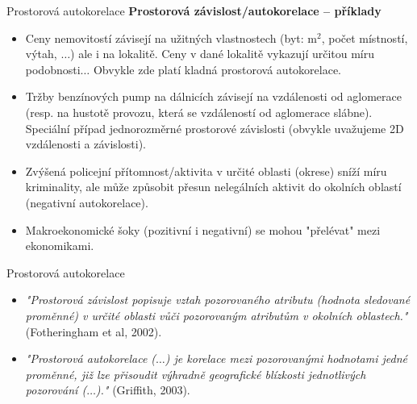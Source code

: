 \documentclass{beamer}
\begin{document}
\begin{frame}{Prostorová autokorelace}
\textbf{Prostorová závislost/autokorelace – příklady}
\begin{itemize}
	\item Ceny nemovitostí závisejí na užitných vlastnostech (byt: m$^2$, počet místností, výtah, $\dots$) ale i na lokalitě. Ceny v dané lokalitě vykazují určitou míru podobnosti$\dots$ Obvykle zde platí kladná prostorová autokorelace. 
	\item Tržby benzínových pump na dálnicích závisejí na vzdálenosti od aglomerace (resp. na hustotě provozu, která se vzdáleností od aglomerace slábne). Speciální případ jednorozměrné prostorové závislosti (obvykle uvažujeme 2D vzdálenosti a závislosti).
	\item Zvýšená policejní přítomnost/aktivita v určité oblasti (okrese) sníží míru kriminality, ale může způsobit přesun nelegálních aktivit do okolních oblastí (negativní autokorelace).
	\item Makroekonomické šoky (pozitivní i negativní) se mohou "přelévat" mezi ekonomikami. 
\end{itemize}
\end{frame}
\begin{frame}{Prostorová autokorelace}
\begin{itemize}
	\item \textit{"Prostorová závislost popisuje vztah pozorovaného atributu (hodnota sledované proměnné) v určité oblasti vůči pozorovaným atributům v okolních oblastech."} (Fotheringham et al, 2002).
	
	\item \textit{"Prostorová autokorelace ($\dots$) je korelace mezi pozorovanými hodnotami jedné proměnné, již lze přisoudit výhradně geografické blízkosti jednotlivých pozorování ($\dots$)."} (Griffith, 2003).
\end{itemize}
\end{frame}
\end{document}
